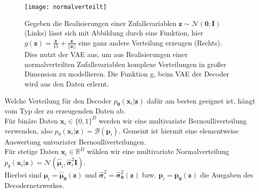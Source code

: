 \documentclass[12pt]{article}
\newcommand{\pdec}{p_{\boldsymbol\theta}(\mathbf{x}_i|\mathbf{z})}
\newcommand{\z}{\mathbf{z}}
\begin{document}
	\vspace*{0.1cm}
	\begin{figure}[h!]
		\centering
		\texttt{[image: normalverteilt]}
		\captionsetup{labelformat=empty}
		\caption{Gegeben die Realisierungen einer Zufallsvariablen $\z\sim \mathcal{N}(\mathbf{0},\mathbf{I})$  (Links) lässt sich mit Abbildung durch eine Funktion, hier $g(\textbf{z})= \frac{\textbf{z}}{15}+\frac{\textbf{z}}{||\textbf{z}||}$ eine ganz andere Verteilung erzeugen (Rechts). Dies nutzt der VAE aus, um aus Realisierungen einer normalverteilten Zufallsvariablen komplexe Verteilungen in großer Dimension zu modellieren. Die Funktion g, beim VAE der Decoder wird aus den Daten erlernt. \textbf{}\cite{tutvae}}
	\end{figure}

	Welche Verteilung für den Decoder $\pdec$ dafür am besten geeignet ist, hängt vom Typ der zu erzeugenden Daten ab.\\ Für binäre Daten  $\textbf{x}_{i} \in \{0,1\}^{D}$ werden wir eine multivariate Bernoulliverteilung verwenden, also $p_{\theta}(\textbf{x}_{i}|\textbf{z}) =  \mathcal{B}(\boldsymbol{p}_{i})$. Gemeint ist hiermit eine elementweise Auswertung univariater Bernoulliverteilungen.\\
	Für stetige Daten $\textbf{x}_{i} \in \mathbb{R}^{D}$ wählen wir eine multivariate Normalverteilung $p_{\theta}(\textbf{x}_{i}|\textbf{z}) = \mathcal{N}(\boldsymbol{\hat{\mu}}_{i},\boldsymbol{\hat{\sigma}}_{i}^{2}\textbf{I})$.\\
	Hierbei sind $\boldsymbol{\hat{\mu}}_{i} = \boldsymbol{\hat{\mu}}_{\boldsymbol\theta}(\textbf{z})$ und $\boldsymbol{\hat{\sigma}}_{i}^{2} = \boldsymbol{\hat{\sigma}}_{\boldsymbol\theta}^{2}(\textbf{z}) $ bzw. $\textbf{p}_{i} = \textbf{p}_{\boldsymbol\theta}(\textbf{z})$ die Ausgaben des Decodernetzwerkes.\newpage
\end{document}
